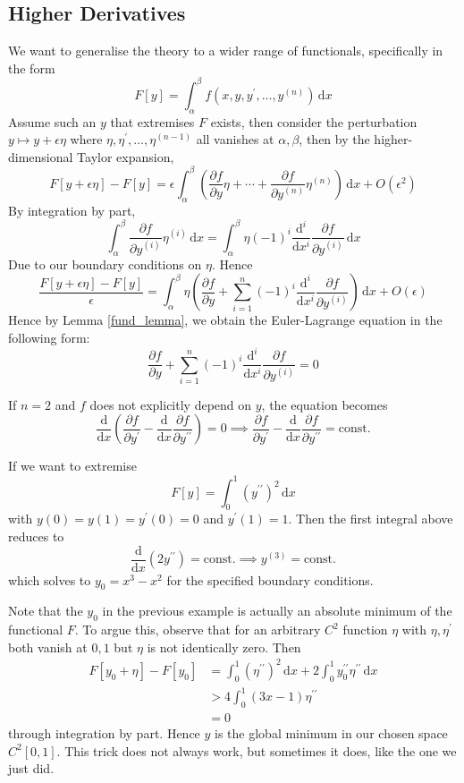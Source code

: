 \documentclass[a4paper]{article}
\begin{document}
\subsection{Higher Derivatives}
We want to generalise the theory to a wider range of functionals, specifically in the form
$$F[y]=\int_\alpha^\beta f(x,y,y^\prime,\ldots,y^{(n)})\,\mathrm dx$$
Assume such an $y$ that extremises $F$ exists, then consider the perturbation $y\mapsto y+\epsilon\eta$ where $\eta,\eta^\prime,\ldots,\eta^{(n-1)}$ all vanishes at $\alpha,\beta$, then by the higher-dimensional Taylor expansion,
$$F[y+\epsilon\eta]-F[y]=\epsilon\int_\alpha^\beta\left( \frac{\partial f}{\partial y}\eta+\cdots +\frac{\partial f}{\partial y^{(n)}}\eta^{(n)} \right)\,\mathrm dx+O(\epsilon^2)$$
By integration by part,
$$\int_\alpha^\beta\frac{\partial f}{\partial y^{(i)}}\eta^{(i)}\,\mathrm dx=\int_\alpha^\beta\eta(-1)^i\frac{\mathrm d^i}{\mathrm dx^i}\frac{\partial f}{\partial y^{(i)}}\,\mathrm dx$$
Due to our boundary conditions on $\eta$.
Hence
$$\frac{F[y+\epsilon\eta]-F[y]}{\epsilon}=\int_\alpha^\beta \eta\left(\frac{\partial f}{\partial y}+\sum_{i=1}^n(-1)^i\frac{\mathrm d^i}{\mathrm dx^i}\frac{\partial f}{\partial y^{(i)}}\right)\,\mathrm dx+O(\epsilon)$$
Hence by Lemma \ref{fund_lemma}, we obtain the Euler-Lagrange equation in the following form:
$$\boxed{\frac{\partial f}{\partial y}+\sum_{i=1}^n(-1)^i\frac{\mathrm d^i}{\mathrm dx^i}\frac{\partial f}{\partial y^{(i)}}=0}$$
\begin{example}
    If $n=2$ and $f$ does not explicitly depend on $y$, the equation becomes
    $$\frac{\mathrm d}{\mathrm dx}\left( \frac{\partial f}{\partial y^\prime}-\frac{\mathrm d}{\mathrm dx}\frac{\partial f}{\partial y^{\prime\prime}} \right)=0\implies \frac{\partial f}{\partial y^\prime}-\frac{\mathrm d}{\mathrm dx}\frac{\partial f}{\partial y^{\prime\prime}}=\text{const.}$$
\end{example}
\begin{example}
    If we want to extremise
    $$F[y]=\int_0^1(y^{\prime\prime})^2\,\mathrm dx$$
    with $y(0)=y(1)=y^\prime(0)=0$ and $y^\prime(1)=1$.
    Then the first integral above reduces to
    $$\frac{\mathrm d}{\mathrm dx}(2y^{\prime\prime})=\text{const.}\implies y^{(3)}=\text{const.}$$
    which solves to $y_0=x^3-x^2$ for the specified boundary conditions.
\end{example}
Note that the $y_0$ in the previous example is actually an absolute minimum of the functional $F$.
To argue this, observe that for an arbitrary $C^2$ function $\eta$ with $\eta,\eta^\prime$ both vanish at $0,1$ but $\eta$ is not identically zero.
Then
\begin{align*}
    F[y_0+\eta]-F[y_0]&=\int_0^1(\eta^{\prime\prime})^2\,\mathrm dx+2\int_0^1 y_0^{\prime\prime}\eta^{\prime\prime}\,\mathrm dx\\
    &>4\int_0^1(3x-1)\eta^{\prime\prime}\\
    &=0
\end{align*}
through integration by part.
Hence $y$ is the global minimum in our chosen space $C^2[0,1]$.
This trick does not always work, but sometimes it does, like the one we just did.
\end{document}
